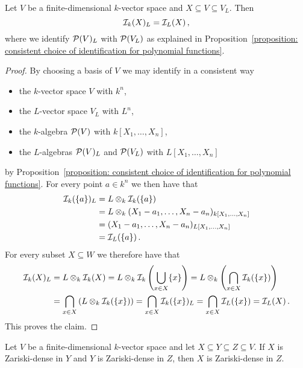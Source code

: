 \begin{corollary}
  Let $V$ be a finite-dimensional $k$-vector space and $X \subseteq V \subseteq V_L$.
  Then
  \[
      \mathcal{I}_k(X)_L
    = \mathcal{I}_L(X) \,,
  \]
  where we identify $\mathcal{P}(V)_L$ with $\mathcal{P}(V_L)$ as explained in Proposition~\ref{proposition: consistent choice of identification for polynomial functions}.
\end{corollary}
\begin{proof}
  By choosing a basis of $V$ we may identify in a consistent way
  \begin{itemize}
    \item
      the $k$-vector space $V$ with $k^n$,
    \item
      the $L$-vector space $V_L$ with $L^n$,
    \item
      the $k$-algebra $\mathcal{P}(V)$ with $k[X_1, \dotsc, X_n]$,
    \item
      the $L$-algebras $\mathcal{P}(V)_L$ and $\mathcal{P}(V_L)$ with $L[X_1, \dotsc, X_n]$
  \end{itemize}
  by Proposition~\ref{proposition: consistent choice of identification for polynomial functions}.
  For every point $a \in k^n$ we then have that
  \begin{align*}
        \mathcal{I}_k(\{a\})_L
    &=  L \otimes_k \mathcal{I}_k(\{a\}) \\
    &=  L \otimes_k ( X_1 - a_1, \dotsc, X_n - a_n )_{ k[X_1, \dotsc, X_n] } \\
    &=  ( X_1 - a_1, \dotsc, X_n - a_n )_{ L[X_1, \dotsc, X_n] }  \\
    &=  \mathcal{I}_L(\{a\}) \,.
  \end{align*}
  For every subset $X \subseteq W$ we therefore have that
  \begin{align*}
        \mathcal{I}_k(X)_L
    &=  L \otimes_k \mathcal{I}_k(X)
     =  L \otimes_k \mathcal{I}_k\left( \bigcup_{x \in X} \{x\} \right)
     =  L \otimes_k \left( \bigcap_{x \in X} \mathcal{I}_k(\{x\}) \right)  \\
    &=  \bigcap_{x \in X} \left( L \otimes_k \mathcal{I}_k(\{x\}) \right)
     =  \bigcap_{x \in X} \mathcal{I}_k(\{x\})_L
     =  \bigcap_{x \in X} \mathcal{I}_L(\{x\})
     =  \mathcal{I}_L(X) \,.
  \end{align*}
  This proves the claim.
\end{proof}


\begin{lemma}
  Let $V$ be a finite-dimensional $k$-vector space and let $X \subseteq Y \subseteq Z \subseteq V$.
  If $X$ is Zariski-dense in $Y$ and $Y$ is Zariski-dense in $Z$, then $X$ is Zariski-dense in $Z$.
\end{lemma}


